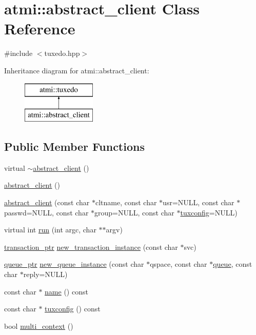 \hypertarget{classatmi_1_1abstract__client}{}\section{atmi\+:\+:abstract\+\_\+client Class Reference}
\label{classatmi_1_1abstract__client}


{\ttfamily \#include $<$tuxedo.\+hpp$>$}

Inheritance diagram for atmi\+:\+:abstract\+\_\+client\+:\begin{figure}[H]
\begin{center}
\leavevmode
\includegraphics[height=2.000000cm]{classatmi_1_1abstract__client}
\end{center}
\end{figure}
\subsection*{Public Member Functions}
\begin{DoxyCompactItemize}
\item 
virtual \hyperlink{classatmi_1_1abstract__client_a789a662f195c11cd9d9b6d091caa0874}{$\sim$abstract\+\_\+client} ()
\item 
\hyperlink{classatmi_1_1abstract__client_a10a6aa2b44cb98ceab7d4e637757437e}{abstract\+\_\+client} ()
\item 
\hyperlink{classatmi_1_1abstract__client_a67d65b7ec70b83b7fc55260256ac4fd0}{abstract\+\_\+client} (const char $\ast$cltname, const char $\ast$usr=N\+U\+L\+L, const char $\ast$passwd=N\+U\+L\+L, const char $\ast$group=N\+U\+L\+L, const char $\ast$\hyperlink{classatmi_1_1abstract__client_af2a6efcd7a45c09251cb129d04d7aa85}{tuxconfig}=N\+U\+L\+L)
\item 
virtual int \hyperlink{classatmi_1_1abstract__client_a090bac30edb1055da2a0c980167bfe19}{run} (int argc, char $\ast$$\ast$argv)
\item 
\hyperlink{group__atmi_gafc1ae4cdb2829f98c37f27b472fcb867}{transaction\+\_\+ptr} \hyperlink{classatmi_1_1abstract__client_a9449f2df2136afd5b253389418265c87}{new\+\_\+transaction\+\_\+instance} (const char $\ast$svc)
\item 
\hyperlink{group__atmi_gaf8c3e342d908ddc295b73c376b7515ca}{queue\+\_\+ptr} \hyperlink{classatmi_1_1abstract__client_a7337c966369376497d9c1f94ec12c5ae}{new\+\_\+queue\+\_\+instance} (const char $\ast$qspace, const char $\ast$\hyperlink{classatmi_1_1queue}{queue}, const char $\ast$reply=N\+U\+L\+L)
\item 
const char $\ast$ \hyperlink{classatmi_1_1abstract__client_a2f50ed746c5bab5e01ef0677296e10e3}{name} () const 
\item 
const char $\ast$ \hyperlink{classatmi_1_1abstract__client_af2a6efcd7a45c09251cb129d04d7aa85}{tuxconfig} () const 
\item 
bool \hyperlink{classatmi_1_1abstract__client_a026c8cff81a66afdcfa3bf977417738a}{multi\+\_\+context} ()
\end{DoxyCompactItemize}
